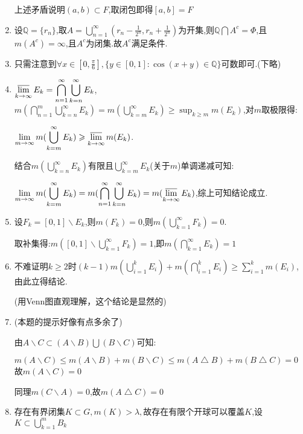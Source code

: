 \documentclass[UTF8, a4paper, 12pt, oneside, onecolumn]{article}
\numberwithin{equation}{section}
\numberwithin{figure}{section}
\numberwithin{table}{section}
\theoremstyle{nonumberplain}	%
\theoremstyle{plain}	%
\theoremstyle{plain}	%
\theoremstyle{plain}	%
\theoremstyle{plain}	%
\theoremstyle{nonumberplain}
\begin{document}
\begin{enumerate}
	上述矛盾说明$(a,b)\subset F$,取闭包即得$[a,b]=F$
	
	\item 设$\mathbb{Q}=\{r_n\}$,取$A=\displaystyle\bigcup_{n=1}^{\infty}(r_n-\frac{1}{2^n},r_n+\frac{1}{2^n})$为开集,则$\mathbb{Q}\bigcap A^c=\Phi$,且$m(A^c)=\infty$,且$A^c$为闭集.故$A^c$满足条件.
	
	\item 只需注意到$\displaystyle\forall x\in [0,\frac{\pi}{6}],\{y\in[0,1]:\cos(x+y)\in \mathbb{Q}\}$可数即可.(下略)
	
	\item $\displaystyle\varlimsup_{k\rightarrow \infty}E_k=\bigcap_{n=1}^{\infty}\bigcup_{k=n}^{\infty}E_k$,$\displaystyle m(\bigcap_{n=1}^{m}\bigcup_{k=n}^{\infty}E_k)=m(\bigcup_{k=m}^{\infty}E_k)\geqslant\sup_{k\geqslant m}m(E_k)$,对$m$取极限得:
	
	$\displaystyle\lim_{m\rightarrow \infty}m(\bigcup_{k=m}^{\infty}E_k)\geqslant\varlimsup_{k\rightarrow\infty}m(E_k)$.
	
	结合$\displaystyle m(\bigcup_{k=n}^{\infty}E_k)$有限且$\displaystyle\bigcup_{k=m}^{\infty}E_k$(关于$m$)单调递减可知:
	
	$\displaystyle\lim_{m\rightarrow \infty}m(\bigcup_{k=m}^{\infty}E_k)=m(\bigcap_{n=1}^{\infty}\bigcup_{k=n}^{\infty}E_k)=m(\varlimsup_{k\rightarrow \infty}E_k)$,综上可知结论成立.
	
	\item 设$F_k=[0,1]\backslash E_k$,则$m(F_k)=0$,则$m(\displaystyle\bigcup_{k=1}^{\infty}F_k)=0$.
	
	取补集得:$m(\displaystyle[0,1]\backslash\bigcup_{k=1}^{\infty}F_k)=1$,即$m(\displaystyle\bigcap_{k=1}^{\infty}E_k)=1$
	
	\item 不难证明$k\geqslant 2$时$(k-1)m(\displaystyle\bigcup_{i=1}^{k}E_i)+m(\bigcap_{i=1}^{k}E_i)\geqslant \sum_{i=1}^{k}m(E_i)$,由此立得结论.
	
	(用Venn图直观理解，这个结论是显然的)
	
	\item (本题的提示好像有点多余了)
	
	由$A\backslash C\subset (A \backslash B)\bigcup (B\backslash C)$可知:
	
	$m(A\backslash C)\leqslant m(A \backslash B)+m( B\backslash C)\leqslant m(A \bigtriangleup B)+m( B\bigtriangleup C)=0$故$m(A\backslash C)=0$
	
	同理$m(C\backslash A)=0$,故$m( A\bigtriangleup C)=0$
	
	
	\item 存在有界闭集$\displaystyle K\subset G,m(K)>\lambda,$故存在有限个开球可以覆盖$K$,设$\displaystyle K\subset \bigcup_{k=1}^{m}B_k$
	

\end{enumerate}
\end{document}
